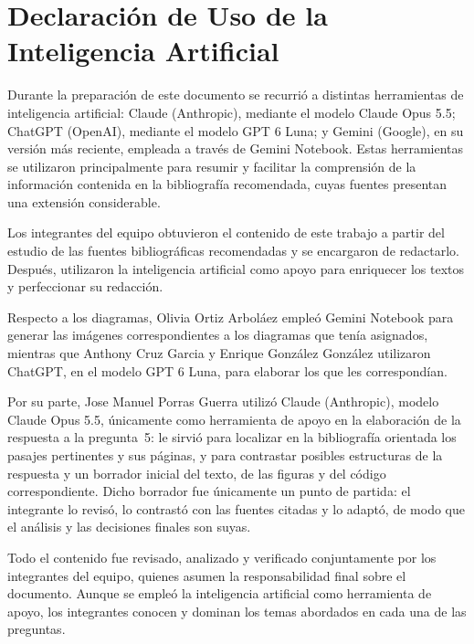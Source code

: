 \newpage
\section*{Declaración de Uso de la Inteligencia Artificial}

Durante la preparación de este documento se recurrió a distintas herramientas de inteligencia
artificial: Claude (Anthropic), mediante el modelo Claude Opus 5.5; ChatGPT (OpenAI), mediante
el modelo GPT 6 Luna; y Gemini (Google), en su versión más reciente, empleada a través de
Gemini Notebook. Estas herramientas se utilizaron principalmente para resumir y facilitar la
comprensión de la información contenida en la bibliografía recomendada, cuyas fuentes presentan
una extensión considerable.

Los integrantes del equipo obtuvieron el contenido de este trabajo a partir del estudio de las
fuentes bibliográficas recomendadas y se encargaron de redactarlo. Después, utilizaron la
inteligencia artificial como apoyo para enriquecer los textos y perfeccionar su redacción.

Respecto a los diagramas, Olivia Ortiz Arboláez empleó Gemini Notebook para generar las
imágenes correspondientes a los diagramas que tenía asignados, mientras que Anthony Cruz
Garcia y Enrique González González utilizaron ChatGPT, en el modelo GPT 6 Luna, para elaborar los que les correspondían.

Por su parte, Jose Manuel Porras Guerra utilizó Claude (Anthropic), modelo Claude Opus 5.5,
únicamente como herramienta de apoyo en la elaboración de la respuesta a la pregunta~5: le sirvió
para localizar en la bibliografía orientada los pasajes pertinentes y sus páginas, y para contrastar
posibles estructuras de la respuesta y un borrador inicial del texto, de las figuras y del código
correspondiente. Dicho borrador fue únicamente un punto de partida: el integrante lo revisó, lo
contrastó con las fuentes citadas y lo adaptó, de modo que el análisis y las decisiones finales
son suyas.

Todo el contenido fue revisado, analizado y verificado conjuntamente por los integrantes del
equipo, quienes asumen la responsabilidad final sobre el documento. Aunque se empleó la
inteligencia artificial como herramienta de apoyo, los integrantes conocen y dominan los temas
abordados en cada una de las preguntas.
